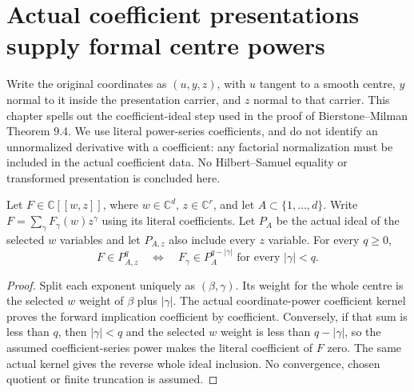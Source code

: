 \section{Actual coefficient presentations supply formal centre powers}

Write the original coordinates as $(u,y,z)$, with $u$ tangent to a smooth
centre, $y$ normal to it inside the presentation carrier, and $z$ normal to
that carrier. This chapter spells out the coefficient-ideal step used in
the proof of Bierstone--Milman Theorem 9.4. We use literal power-series
coefficients, and do not identify an unnormalized derivative with a
coefficient: any factorial normalization must be included in the actual
coefficient data. No Hilbert--Samuel equality or transformed presentation
is concluded here.

\begin{lemma}
\label{hir:actual-formal-centre-power-relative-coefficients}
\leanok
Let $F\in\mathbb C[[w,z]]$, where $w\in\mathbb C^d$, $z\in\mathbb C^r$,
and let $A\subset\{1,\ldots,d\}$. Write $F=\sum_\gamma F_\gamma(w)z^\gamma$
using its literal coefficients. Let $P_A$ be the actual ideal of the
selected $w$ variables and let $P_{A,z}$ also include every $z$ variable.
For every $q\ge0$,
\[
 F\in P_{A,z}^q\quad\Longleftrightarrow\quad
 F_\gamma\in P_A^{q-|\gamma|}\text{ for every }|\gamma|<q.
\]
\end{lemma}
\begin{proof}
Split each exponent uniquely as $(\beta,\gamma)$. Its weight for the
whole centre is the selected $w$ weight of $\beta$ plus $|\gamma|$.
The actual coordinate-power coefficient kernel proves the forward
implication coefficient by coefficient. Conversely, if that sum is less
than $q$, then $|\gamma|<q$ and the selected $w$ weight is less than
$q-|\gamma|$, so the assumed coefficient-series power makes the literal
coefficient of $F$ zero. The same actual kernel gives the reverse whole
ideal inclusion. No convergence, chosen quotient or finite truncation is
assumed.
\end{proof}

